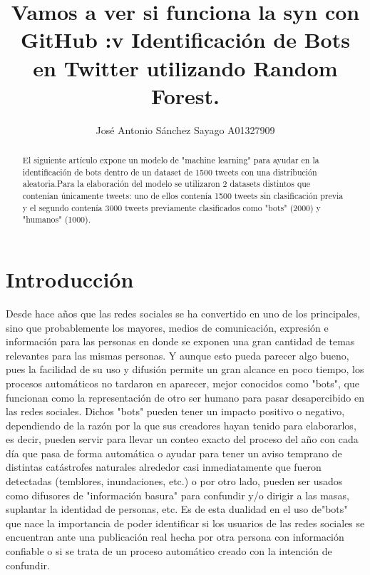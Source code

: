 \documentclass[runningheads]{llncs}
\begin{document}
%
\title{ Vamos a ver si funciona la syn con GitHub :v Identificación de Bots en Twitter utilizando Random Forest.}
%
%
\author{José Antonio Sánchez Sayago A01327909}
%

%
%
\maketitle              %
%
\begin{abstract} 
El siguiente artículo expone un modelo de "machine learning" para ayudar en la identificación de bots dentro de un dataset de 1500 tweets con una distribución aleatoria.Para la elaboración del modelo se utilizaron 2 datasets distintos que contenían únicamente tweets: uno de ellos contenía 1500 tweets sin clasificación previa y el segundo contenía 3000 tweets previamente clasificados como "bots" (2000) y "humanos" (1000).

\end{abstract}
%
%
%
\section{Introducción}
Desde hace años que las redes sociales se ha convertido en uno de los principales, sino que probablemente los mayores, medios de comunicación, expresión e información para las personas en donde se exponen una gran cantidad de temas relevantes para las mismas personas. Y aunque esto pueda parecer algo bueno, pues la facilidad de su uso y difusión permite un gran alcance en poco tiempo, los procesos automáticos no tardaron en aparecer, mejor conocidos como "bots", que funcionan como la representación de otro ser humano para pasar desapercibido en las redes sociales. Dichos "bots" pueden tener un impacto positivo o negativo, dependiendo de la razón por la que sus creadores hayan tenido para elaborarlos, es decir, pueden servir para llevar un conteo exacto del proceso del año con cada día que pasa de forma automática o ayudar para tener un aviso temprano de distintas catástrofes naturales alrededor casi inmediatamente que fueron detectadas (temblores, inundaciones, etc.) o por otro lado, pueden ser usados como difusores de "información basura" para confundir y/o dirigir a las masas, suplantar la identidad de personas, etc.
Es de esta dualidad en el uso de"bots" que nace la importancia de poder identificar si los usuarios de las redes sociales se encuentran ante una publicación real hecha por otra persona con información confiable o si se trata de un proceso automático creado con la intención de confundir.
\end{document}

